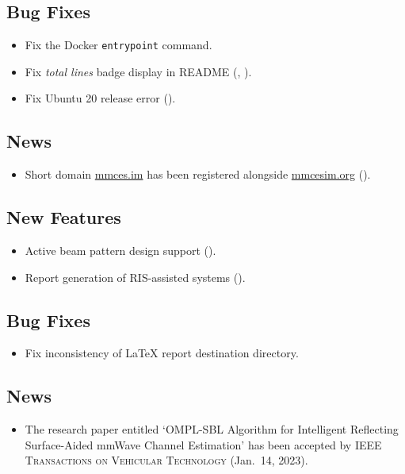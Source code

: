 \subsection*{Bug Fixes}
\begin{itemize}
  \item Fix the Docker \texttt{entrypoint} command.
  \item Fix \textit{total lines} badge display in README (, ).
  \item Fix Ubuntu 20 release error ().
\end{itemize}
\subsection*{News}
\begin{itemize}
  \item Short domain \href{https://mmces.im}{mmces.im} has been registered alongside \href{https://mmcesim.org}{mmcesim.org} ().
\end{itemize}

\subsection*{New Features}
\begin{itemize}
  \item Active beam pattern design support ().
  \item Report generation of RIS-assisted systems ().
\end{itemize}
\subsection*{Bug Fixes}
\begin{itemize}
  \item Fix inconsistency of \LaTeX{} report destination directory.
\end{itemize}
\subsection*{News}
\begin{itemize}
  \item The research paper entitled `OMPL-SBL Algorithm for Intelligent Reflecting Surface-Aided mmWave Channel Estimation' has been accepted by \textsc{IEEE Transactions on Vehicular Technology} (Jan.~14, 2023).
\end{itemize}

